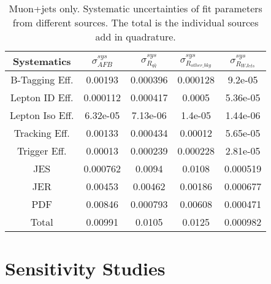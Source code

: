 \documentclass{cmspaperpdf}
\begin{document}
\begin{table}[htb]
\centering
\label{tab:mu-sys-err}
\begin{tabular}{ccccc}
Systematics &    $\sigma_{AFB}^{sys}$ & $\sigma_{R_{q\bar{q}}}^{sys}$ & $\sigma_{R_{other\_bkg}}^{sys}$ & $\sigma_{R_{WJets}}^{sys}$ \\
\hline
B-Tagging Eff.  &     0.00193 &     0.000396 &            0.000128 &         9.2e-05 \\
Lepton ID Eff.  &    0.000112 &     0.000417 &              0.0005 &        5.36e-05 \\
Lepton Iso Eff. &    6.32e-05 &     7.13e-06 &             1.4e-05 &        1.44e-06 \\
Tracking Eff.   &     0.00133 &     0.000434 &             0.00012 &        5.65e-05 \\
Trigger Eff.    &     0.00013 &     0.000239 &            0.000228 &        2.81e-05 \\
\hline
JES             &    0.000762 &       0.0094 &              0.0108 &        0.000519 \\
JER             &     0.00453 &      0.00462 &             0.00186 &        0.000677 \\
PDF             &     0.00846 &     0.000793 &             0.00608 &        0.000471 \\
\hline
Total           &     0.00991 &       0.0105 &              0.0125 &        0.000982 \\
\hline
\end{tabular}
\caption{Muon+jets only. Systematic uncertainties of fit parameters from different sources. The total is the individual sources add in quadrature. }
\end{table}




\section{Sensitivity Studies}
\end{document}
